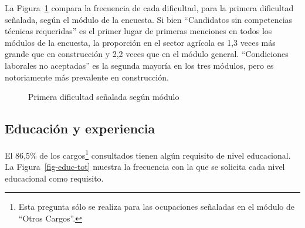 \documentclass[
  11pt,
]{article}
\begin{document}
La Figura~\ref{fig-dificultad} compara la frecuencia de cada dificultad,
para la primera dificultad señalada, según el módulo de la encuesta. Si
bien ``Candidatos sin competencias técnicas requeridas'' es el primer
lugar de primeras menciones en todos los módulos de la encuesta, la
proporción en el sector agrícola es 1,3 veces más grande que en
construcción y 2,2 veces que en el módulo general. ``Condiciones
laborales no aceptadas'' es la segunda mayoría en los tres módulos, pero
es notoriamente más prevalente en construcción.

\begin{figure}[H]

\caption{\label{fig-dificultad}Primera dificultad señalada según módulo}


\end{figure}%

\newpage

\subsection{Educación y experiencia}\label{educaciuxf3n-y-experiencia}

El 86,5\% de los cargos\footnote{Esta pregunta sólo se realiza para las
  ocupaciones señaladas en el módulo de ``Otros Cargos''.} consultados
tienen algún requisito de nivel educacional. La
Figura~\ref{fig-educ-tot} muestra la frecuencia con la que se solicita
cada nivel educacional como requisito.
\end{document}
